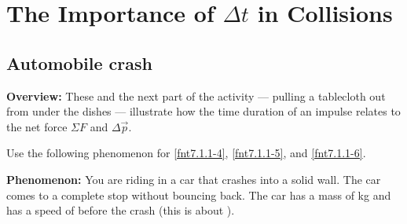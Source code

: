 \section{The Importance of $\Delta t$ in Collisions}



\subsection{Automobile crash}

\begin{overview}
\textbf{Overview:} These \FNTs{} and the next part of the activity --- pulling a tablecloth out from under the dishes --- illustrate how the time duration of an impulse relates to the net force $\Sigma F$ and $\Delta \vec{p}$.
\end{overview}

Use the following phenomenon for \ref{fnt7.1.1-4}, \ref{fnt7.1.1-5}, and \ref{fnt7.1.1-6}.

\textbf{Phenomenon:} You are riding in a car that crashes into a solid wall.  The car comes to a complete stop without bouncing back.  The car has a mass of \unit[1500]{kg} and has a speed of  before the crash (this is about ). 

\begin{FNTenv}
	
\end{FNTenv}

\begin{FNTenv}
	
\end{FNTenv}

\begin{FNTenv}
	
\end{FNTenv}

